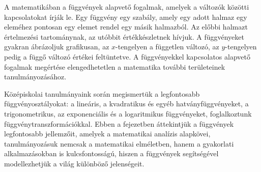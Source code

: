 

\bgroup
\color{gray!50!black}
\sffamily

A matematikában a függvények alapvető fogalmak, amelyek a változók közötti
kapcsolatokat írják le. Egy függvény egy szabály, amely egy adott halmaz egy
eleméhez pontosan egy elemet rendel egy másik halmazból. Az előbbi halmazt
értelmezési tartománynak, az utóbbit értékkészletnek hívjuk. A függvényeket
gyakran ábrázoljuk grafikusan, az $x$-tengelyen a független változó, az
$y$-tengelyen pedig a függő változó értékei feltüntetve. A függvényekkel
kapcsolatos alapvető fogalmak megértése elengedhetetlen a matematika további
területeinek tanulmányozásához.

Középiskolai tanulmányaink során megismertük a legfontosabb függvényosztályokat:
a lineáris, a kvadratikus és egyéb hatványfüggvényeket, a trigonometrikus, az
exponenciális és a logaritmikus függvényeket, foglalkoztunk
függvénytranszformációkkal. Ebben a fejezetben áttekintjük a függvények
legfontosabb jellemzőit, amelyek a matematikai analízis alapkövei,
tanulmányozásuk nemcsak a matematikai elméletben, hanem a gyakorlati
alkalmazásokban is kulcsfontosságú, hiszen a függvények segítségével
modellezhetjük a világ különböző jelenségeit.

\chaptertoc
\egroup

\clearpage